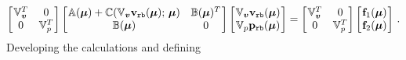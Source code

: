 \documentclass[12pt, a4paper, twoside, openright]{report}
\numberwithin{equation}{chapter}
\theoremstyle{theorem}
\theoremstyle{definition}
\theoremstyle{remark}
\theoremstyle{proposition}
\numberwithin{figure}{chapter}
\newcommand{\bg}[1]{\boldsymbol{#1}}
\begin{document}
		\begin{equation}
			\label{eq:ns-reduced-system}
			\begin{bmatrix}
			\hspace*{-0.15cm}
			\begin{array}{cc}
				\mathbb{V}_{\bg{v}}^T & 0 \\
				0 & \mathbb{V}_p^T
			\end{array} 
			\hspace*{-0.15cm}
			\end{bmatrix} 
			\begin{bmatrix}
			\hspace*{-0.15cm}
			\begin{array}{cc}
				\mathbb{A}(\bg{\mu}) + \mathbb{C}(\mathbb{V}_{\bg{v}} \mathbf{v}_{\texttt{rb}}(\bg{\mu}); \, \bg{\mu}) & \mathbb{B}(\bg{\mu})^T \\
				\mathbb{B}(\bg{\mu}) & 0
			\end{array} 
			\hspace*{-0.15cm}
			\end{bmatrix} 
			\begin{bmatrix}
			\hspace*{-0.15cm}
			\begin{array}{c}
				\mathbb{V}_{\bg{v}} \mathbf{v}_{\texttt{rb}}(\bg{\mu}) \\
				\mathbb{V}_{p} \mathbf{p}_{\texttt{rb}}(\bg{\mu})
			\end{array} 
			\hspace*{-0.15cm}
			\end{bmatrix} 
			=
			\begin{bmatrix}
			\hspace*{-0.15cm}
			\begin{array}{cc}
				\mathbb{V}_{\bg{v}}^T & 0 \\
				0 & \mathbb{V}_p^T
			\end{array} 
			\hspace*{-0.15cm}
			\end{bmatrix} 
			\begin{bmatrix}
			\hspace*{-0.15cm}
			\begin{array}{c}
				\mathbf{f}_1(\bg{\mu}) \\
				\mathbf{f}_2(\bg{\mu})
			\end{array} 
			\hspace*{-0.15cm}
			\end{bmatrix} \, .
		\end{equation}
		Developing the calculations and defining
\end{document}
